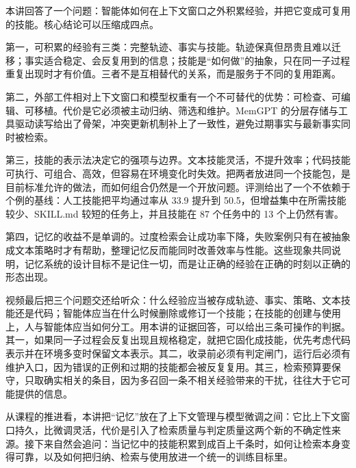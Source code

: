 \documentclass[a4paper]{article}
\begin{document}
本讲回答了一个问题：智能体如何在上下文窗口之外积累经验，并把它变成可复用的技能。核心结论可以压缩成四点。

第一，可积累的经验有三类：完整轨迹、事实与技能。轨迹保真但昂贵且难以迁移；事实适合稳定、会反复用到的信息；技能是“如何做”的抽象，只在同一子过程重复出现时才有价值。三者不是互相替代的关系，而是服务于不同的复用距离。

第二，外部工件相对上下文窗口和模型权重有一个不可替代的优势：可检查、可编辑、可移植。代价是它必须被主动归纳、筛选和维护。MemGPT 的分层存储与工具驱动读写给出了骨架，冲突更新机制补上了一致性，避免过期事实与最新事实同时被检索。

第三，技能的表示法决定它的强项与边界。文本技能灵活，不提升效率；代码技能可执行、可组合、高效，但容易在环境变化时失效。把两者放进同一个技能包，是目前标准允许的做法，而如何组合仍然是一个开放问题。评测给出了一个不依赖于个例的基线：人工技能把平均通过率从 33.9 提升到 50.5，但增益集中在所需技能较少、SKILL.md 较短的任务上，并且技能在 87 个任务中的 13 个上仍然有害。

第四，记忆的收益不是单调的。过度检索会让成功率下降，失败案例只有在被抽象成文本策略时才有帮助，整理记忆反而能同时改善效率与性能。这些现象共同说明，记忆系统的设计目标不是记住一切，而是让正确的经验在正确的时刻以正确的形态出现。

视频最后把三个问题交还给听众：什么经验应当被存成轨迹、事实、策略、文本技能还是代码；智能体应当在什么时候删除或修订一个技能；在技能的创建与使用上，人与智能体应当如何分工。用本讲的证据回答，可以给出三条可操作的判据。其一，如果同一子过程会反复出现且规格稳定，就把它固化成技能，优先考虑代码表示并在环境多变时保留文本表示。其二，收录前必须有判定闸门，运行后必须有维护入口，因为错误的正例和过期的技能都会被反复复用。其三，检索预算要保守，只取确实相关的条目，因为多召回一条不相关经验带来的干扰，往往大于它可能提供的信息。

从课程的推进看，本讲把“记忆”放在了上下文管理与模型微调之间：它比上下文窗口持久，比微调灵活，代价是引入了检索质量与判定质量这两个新的不确定性来源。接下来自然会追问：当记忆中的技能积累到成百上千条时，如何让检索本身变得可靠，以及如何把归纳、检索与使用放进一个统一的训练目标里。
\end{document}
